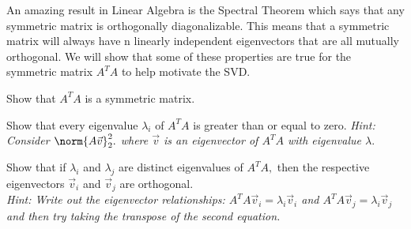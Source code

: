 


An amazing result in Linear Algebra is the Spectral Theorem which says that any symmetric matrix is orthogonally diagonalizable.
This means that a symmetric matrix will always have n linearly independent eigenvectors that are all mutually orthogonal.
We will show that some of these properties are true for the symmetric matrix $A^{T}A$ to help motivate the SVD.

\begin{enumerate}
  \qitem Show that $A^{T}A$ is a symmetric matrix.

  \ws{
  \vspace{150px}
  }


  \qitem Show that every eigenvalue $\lambda_{i}$ of $A^{T}A$ is greater than or equal to zero. \vskip 1pt
  \textit{Hint: Consider $\norm{A\vec{v}}_{2}^{2}.$ where $\vec{v}$ is an eigenvector of $A^{T}A$ with eigenvalue $\lambda.$}

  \ws{
  \vspace{150px}
  }


  \qitem Show that if $\lambda_{i}$ and $\lambda_{j}$ are distinct eigenvalues of $A^{T} A,$ then the respective eigenvectors $\vec{v}_{i}$ and $\vec{v}_{j}$ are orthogonal. \\
  \textit{Hint: Write out the eigenvector relationships: $A^{T} A \vec{v}_{i} = \lambda_{i} \vec{v}_{i}$ and $A^{T} A \vec{v}_{j} = \lambda_{i} \vec{v}_{j}$ and then try taking the transpose of the second equation.}


\end{enumerate}
